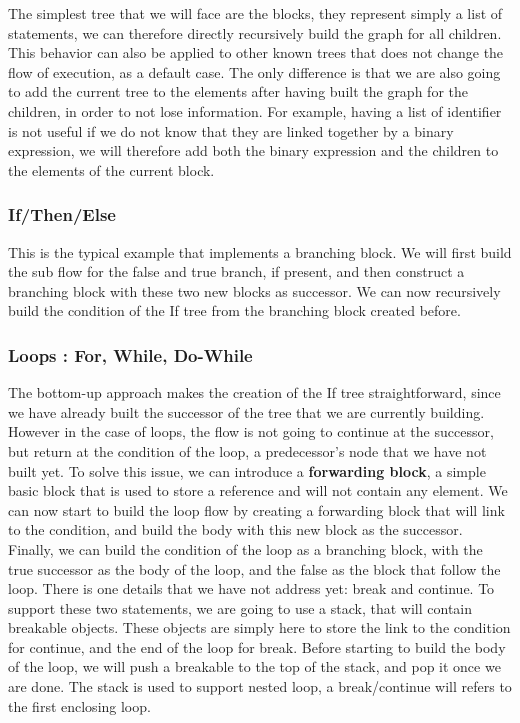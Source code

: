 The simplest tree that we will face are the blocks, they represent simply a list of statements, we can therefore directly recursively build the graph for all children. 
This behavior can also be applied to other known trees that does not change the flow of execution, as a default case. 
The only difference is that we are also going to add the current tree to the elements after having built the graph for the children, in order to not lose information. 
For example, having a list of identifier is not useful if we do not know that they are linked together by a binary expression, we will therefore add both the binary expression and the children to the elements of the current block.

\subsubsection{If/Then/Else}
\label{subsubsec:if_then_else}

This is the typical example that implements a branching block. 
We will first build the sub flow for the false and true branch, if present, and then construct a branching block with these two new blocks as successor. 
We can now recursively build the condition of the If tree from the branching block created before.

\subsubsection{Loops : For, While, Do-While}
\label{subsubsec:loops_cfg}

The bottom-up approach makes the creation of the If tree straightforward, since we have already built the successor of the tree that we are currently building. 
However in the case of loops, the flow is not going to continue at the successor, but return at the condition of the loop, a predecessor’s node that we have not built yet. 
To solve this issue, we can introduce a \textbf{forwarding block}, a simple basic block that is used to store a reference and will not contain any element. 
We can now start to build the loop flow by creating a forwarding block that will link to the condition, and build the body with this new block as the successor. 
Finally, we can build the condition of the loop as a branching block, with the true successor as the body of the loop, and the false as the block that follow the loop.
There is one details that we have not address yet: break and continue. 
To support these two statements, we are going to use a stack, that will contain breakable objects. These objects are simply here to store the link to the condition for continue, and the end of the loop for break. 
Before starting to build the body of the loop, we will push a breakable to the top of the stack, and pop it once we are done. 
The stack is used to support nested loop, a break/continue will refers to the first enclosing loop.

